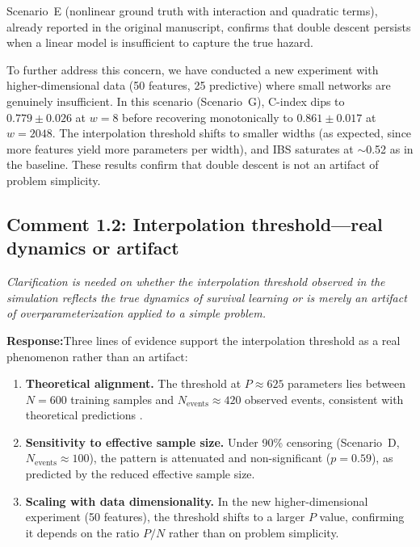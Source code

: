 \documentclass[12pt,a4paper]{article}
\newcommand{\comment}[1]{%
  \begin{reviewerbox}
    \textit{#1}
  \end{reviewerbox}
}
\newcommand{\response}{\noindent\textbf{Response:}\quad}
\begin{document}
Scenario~E (nonlinear ground truth with interaction and quadratic terms),
already reported in the original manuscript, confirms that double descent
persists when a linear model is insufficient to capture the true hazard.

To further address this concern, we have conducted a new experiment with
higher-dimensional data (50 features, 25 predictive) where small networks are
genuinely insufficient. In this scenario (Scenario~G), C-index dips to
$0.779 \pm 0.026$ at $w = 8$ before recovering monotonically to
$0.861 \pm 0.017$ at $w = 2048$. The interpolation threshold shifts to
smaller widths (as expected, since more features yield more parameters per
width), and IBS saturates at $\sim$0.52 as in the baseline. These results
confirm that double descent is not an artifact of problem simplicity.


\bigskip

\subsection*{Comment 1.2: Interpolation threshold---real dynamics or artifact}

\comment{Clarification is needed on whether the interpolation threshold observed in the simulation reflects the true dynamics of survival learning or is merely an artifact of overparameterization applied to a simple problem.}

\response Three lines of evidence support the interpolation threshold as a real
phenomenon rather than an artifact:

\begin{enumerate}
\item \textbf{Theoretical alignment.} The threshold at $P \approx 625$
parameters lies between $N = 600$ training samples and $N_{\text{events}}
\approx 420$ observed events, consistent with theoretical predictions
\citep{liu2025understanding, belkin2019reconciling}.

\item \textbf{Sensitivity to effective sample size.} Under 90\% censoring
(Scenario~D, $N_{\text{events}} \approx 100$), the pattern is attenuated and
non-significant ($p = 0.59$), as predicted by the reduced effective sample
size.

\item \textbf{Scaling with data dimensionality.} In the new
higher-dimensional experiment (50 features), the threshold shifts to a larger
$P$ value, confirming it depends on the ratio $P/N$ rather than on problem
simplicity.
\end{enumerate}
\end{document}
